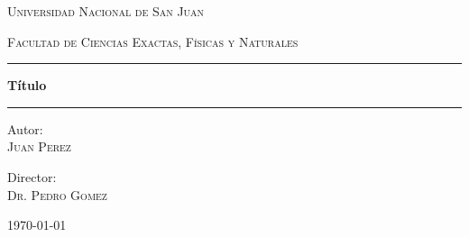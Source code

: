 \begin{titlepage}
\center %

\textsc{\LARGE Universidad Nacional de San Juan}

\vspace{1cm}
\textsc{\Large Facultad de Ciencias Exactas, Físicas y Naturales}

\vspace{1cm}

\rule{\linewidth}{0.5mm}

\vspace{0.5cm}

\textbf{\huge Título}

\rule{\linewidth}{0.5mm}

\vspace{1.8cm}

\begin{minipage}{0.4\textwidth}
\large
\begin{flushleft}
Autor:\\
\textsc{Juan Perez}
\end{flushleft}
\end{minipage}
\begin{minipage}{0.4\textwidth}
\large
\begin{flushright}
Director:\\
\textsc{Dr. Pedro Gomez}
\end{flushright}
\end{minipage}

\vspace{\fill}
{\large \today{}}
\end{titlepage}

\clearpage{} %
\thispagestyle{empty} %

